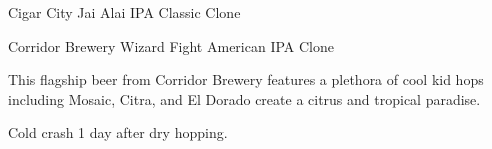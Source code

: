 \begin{recipie}{Cigar City Jai Alai IPA Classic Clone}
\begin{ingredientsblock}

\end{ingredientsblock}

\end{recipie}

\begin{recipie}{Corridor Brewery Wizard Fight American IPA Clone}

\begin{aboutblock}
This flagship beer from Corridor Brewery features a plethora of cool kid hops
including Mosaic, Citra, and El Dorado create a citrus and tropical paradise.
\sourceaha
\end{aboutblock}


\begin{methodandtiming}
 
\begin{mashsteps}
\end{mashsteps}

\begin{fermentationsteps}
\end{fermentationsteps}

\begin{directions}
Cold crash 1 day after dry hopping.
\end{directions}

\end{methodandtiming}

\pagebreak

\begin{ingredientsblock}

\begin{malts}
\end{malts}

\begin{hops}
\end{hops}


\end{ingredientsblock}

\end{recipie}

